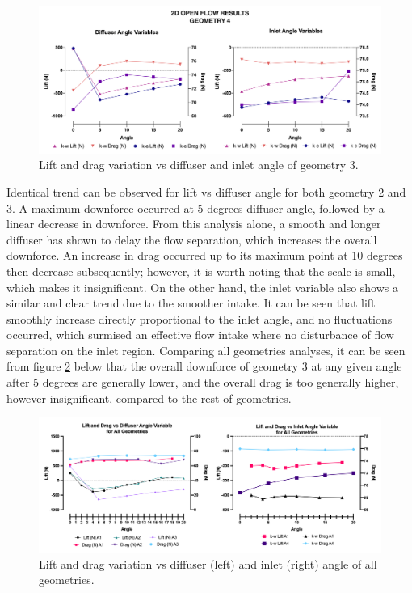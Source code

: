 \begin{figure}[!ht]
    \centering
    \includegraphics[scale=0.6]{Figures/Graph/2D_OF_A4.png}
    \caption{Lift and drag variation vs diffuser and inlet angle of geometry 3.}
    \label{fig:2D_OF_A4_results}
\end{figure}

\noindent Identical trend can be observed for lift vs diffuser angle for both geometry 2 and 3. A maximum downforce occurred at 5 degrees diffuser angle, followed by a linear decrease in downforce. From this analysis alone, a smooth and longer diffuser has shown to delay the flow separation, which increases the overall downforce. An increase in drag occurred up to its maximum point at 10 degrees then decrease subsequently; however, it is worth noting that the scale is small, which makes it insignificant. On the other hand, the inlet variable also shows a similar and clear trend due to the smoother intake. It can be seen that lift smoothly increase directly proportional to the inlet angle, and no fluctuations occurred, which surmised an effective flow intake where no disturbance of flow separation on the inlet region. Comparing all geometries analyses, it can be seen from figure \ref{fig:2D_OF_PLOT_COMPARE_ALL} below that the overall downforce of geometry 3 at any given angle after 5 degrees are generally lower, and the overall drag is too generally higher, however insignificant, compared to the rest of geometries.

\begin{figure}[htb!]
    \centering
    \includegraphics[scale=0.9]{Figures/2D_OF/2D_OF_PLOT_COMPARE_ALL.png}
    \caption{Lift and drag variation vs diffuser (left) and inlet (right) angle of all geometries.}
    \label{fig:2D_OF_PLOT_COMPARE_ALL}
\end{figure}

